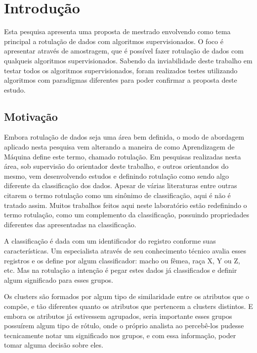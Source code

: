 
\chapter*[Introdução]{Introdução}

Esta pesquisa apresenta uma proposta de mestrado envolvendo como tema principal a rotulação de dados com algoritmos supervisionados. O foco é apresentar através de amostragem, que é possível fazer rotulação de dados com qualqueis algoritmos supervisionados. Sabendo da inviabilidade deste trabalho em  testar todos os algoritmos supervisionados, foram realizados testes utilizando algoritmos com paradigmas diferentes para poder confirmar a proposta deste estudo.

\section*{Motivação}
Embora rotulação de dados seja uma área bem definida, o modo de abordagem aplicado nesta pesquisa vem alterando a maneira de como Aprendizagem de Máquina define este termo, chamado rotulação. Em pesquisas realizadas nesta área, sob supervisão do orientador deste trabalho, e outros orientandos do mesmo, vem desenvolvendo estudos e definindo rotulação como sendo algo diferente da classificação dos dados. Apesar de várias literaturas \cite{Barber2011,Mitchell1997} entre outras citarem o termo rotulação como um sinônimo de classificação, aqui é não é tratado assim. Muitos trabalhos feitos aqui neste laboratório estão redefinindo o termo rotulação, como um complemento da classificação, possuindo propriedades diferentes das apresentadas na classificação.

A classificação é dada com um identificador do registro conforme suas características. Um especialista através de seu conhecimento técnico avalia esses registros e os define por algum classificador: macho ou fêmea, raça X, Y ou Z, etc. Mas na rotulação a intenção é pegar estes dados já classificados e definir algum significado para esses grupos. 

Os clusters são formados por algum tipo de similaridade entre os atributos que o compõe, e tão diferentes quanto os atributos que pertencem a  clusters distintos. E embora os atributos já estivessem agrupados, seria importante esses grupos possuírem algum tipo de rótulo, onde o próprio analista ao percebê-los pudesse tecnicamente notar um significado nos grupos, e com essa informação, poder tomar alguma decisão sobre eles. 

